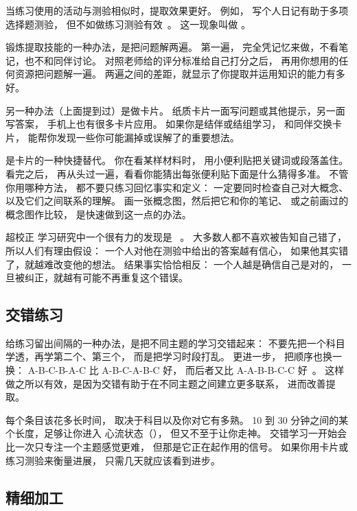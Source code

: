 当练习使用的活动与测验相似时，提取效果更好。
例如，
写个人日记有助于多项选择题测验，
但不如做练习测验有效~\cite{Mill2016a}。
这一现象叫做
。

锻炼提取技能的一种办法，是把问题解两遍。
第一遍，
完全凭记忆来做，不看笔记，也不和同伴讨论。
对照老师给的评分标准给自己打分之后，
再用你想用的任何资源把问题解一遍。
两遍之间的差距，就显示了你提取并运用知识的能力有多好。

另一种办法（上面提到过）是做卡片。
纸质卡片一面写问题或其他提示，另一面写答案，
手机上也有很多卡片应用。
如果你是结伴或结组学习，
和同伴交换卡片，
能帮你发现一些你可能漏掉或误解了的重要想法。

是卡片的一种快捷替代。
你在看某样材料时，
用小便利贴把关键词或段落盖住。
看完之后，
再从头过一遍，看看你能猜出每张便利贴下面是什么猜得多准。
不管你用哪种方法，
都不要只练习回忆事实和定义：
一定要同时检查自己对大概念、
以及它们之间联系的理解。
画一张概念图，然后把它和你的笔记、
或之前画过的概念图作比较，
是快速做到这一点的办法。

\begin{aside}{超校正}
  学习研究中一个很有力的发现是
  ~\cite{Metc2016}。
  大多数人都不喜欢被告知自己错了，
  所以人们有理由假设：
  一个人对他在测验中给出的答案越有信心，
  如果他其实错了，就越难改变他的想法。
  结果事实恰恰相反：
  一个人越是确信自己是对的，
  一旦被纠正，就越有可能不再重复这个错误。
\end{aside}

\subsection*{交错练习}

给练习留出间隔的一种办法，是把不同主题的学习交错起来：
不要先把一个科目学透，再学第二个、第三个，
而是把学习时段打乱。
更进一步，
把顺序也换一换：
A-B-C-B-A-C 比 A-B-C-A-B-C 好，
而后者又比 A-A-B-B-C-C 好~\cite{Rohr2015}。
这样做之所以有效，是因为交错有助于在不同主题之间建立更多联系，
进而改善提取。

每个条目该花多长时间，
取决于科目以及你对它有多熟。
10 到 30 分钟之间的某个长度，足够让你进入
心流状态（），
但又不至于让你走神。
交错学习一开始会比一次只专注一个主题感觉更难，
但那是它正在起作用的信号。
如果你用卡片或练习测验来衡量进展，
只需几天就应该看到进步。

\subsection*{精细加工}

